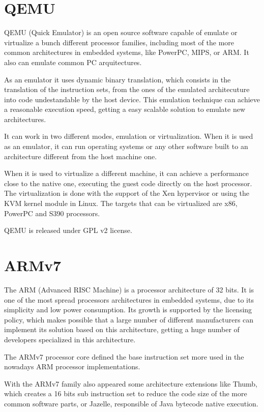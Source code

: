 \documentclass[a4paper,11pt,openany]{report}
\begin{document}
\section{QEMU}
QEMU (Quick Emulator)\cite{qemu} is an open source software capable of emulate or virtualize a bunch different processor families, including most of the more common architectures in embedded systems, like PowerPC, MIPS, or ARM. It also can emulate common PC arquitectures.

As an emulator it uses dynamic binary translation, which consists in the translation of the instruction sets, from the ones of the emulated architecuture into code undestandable by the host device. This emulation technique can achieve a reasonable execution speed, getting a easy scalable solution to emulate new architectures.

It can work in two different modes, emulation or virtualization. When it is used as an emulator, it can run operating systems or any other software built to an architecture different from the host machine one.

When it is used to virtualize a different machine, it can achieve a performance close to the native one, executing the guest code directly on the host processor. The virtualization is done with the support of the Xen hypervisor or using the KVM kernel module in Linux. The targets that can be virtualized are x86, PowerPC and S390 processors.

QEMU is released under GPL v2 license.

\section{ARMv7}
The ARM (Advanced RISC Machine)\cite{arm} is a processor architecture of 32 bits. It is one of the most spread processors architectures in embedded systems, due to its simplicity and low power consumption. Its growth is supported by the licensing policy, which makes possible that a large number of different manufacturers can implement its solution based on this architecture, getting a huge number of developers specialized in this architecture.

The ARMv7 processor core defined the base instruction set more used in the nowadays ARM processor implementations.

With the ARMv7 family also appeared some architecture extensions like Thumb, which creates a 16 bits sub instruction set to reduce the code size of the more common software parts, or Jazelle, responsible of Java bytecode native execution.
\end{document}
